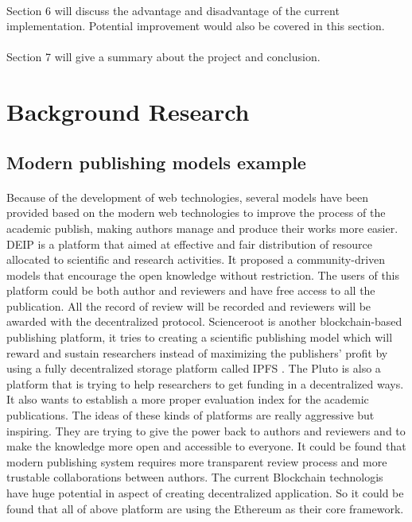 \documentclass [12pt]{article}
\begin{document}
\paragraph{}Section 6 will discuss the advantage and disadvantage of the current implementation.
Potential improvement would also be covered in this section.
\paragraph{}Section 7 will give a summary about the project and conclusion.
\section{Background Research}
\subsection{Modern publishing models example}
\paragraph{}Because of the development of web technologies, 
several models have been provided based on the modern web technologies to improve the process of the academic publish, 
making authors manage and produce their works more easier. 
DEIP \cite{DEIP} is a platform that aimed at effective and 
fair distribution of resource allocated to scientific and research activities.
It proposed a community-driven models that encourage the open knowledge without restriction.
The users of this platform could be both author and reviewers and have free access to all the publication. 
All the record of review will be recorded and reviewers will be awarded with the decentralized protocol.
Scienceroot \cite{science} is another blockchain-based publishing platform, 
it tries to creating a scientific publishing model which will reward and sustain researchers instead of maximizing the publishers' profit 
by using a fully decentralized storage platform called IPFS \cite{benet2014ipfs}. 
The Pluto \cite{Pluto} is also a platform that is trying to help researchers to get funding in a decentralized ways. 
It also wants to establish a more proper evaluation index for the academic publications. 
The ideas of these kinds of platforms are really aggressive but inspiring. 
They are trying to give the power back to authors and reviewers and to make the knowledge more open and accessible to everyone.
It could be found that modern publishing system requires more transparent review process and more trustable collaborations between authors.
The current Blockchain technologis have huge potential in aspect of creating decentralized application. So it could be found that all of above platform are 
using the Ethereum \cite{buterin2013ethereum} as their core framework. 
\end{document}
